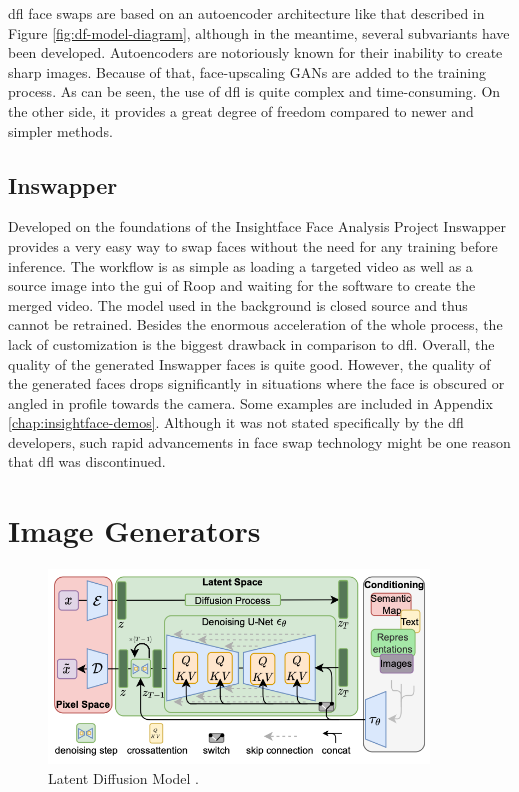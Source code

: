 \documentclass[
  a4paper,  %
  twoside,  %
  bibliography=totoc,
  headsepline,
  cleardoublepage=empty,
  parskip=half,
  draft=false
]{scrbook}
\begin{document}
\gls{dfl} face swaps are based on an autoencoder architecture like that described in Figure \ref{fig:df-model-diagram}, although in the meantime, several subvariants have been developed. Autoencoders are notoriously known for their inability to create sharp images. Because of that, face-upscaling GANs are added to the training process. As can be seen, the use of \gls{dfl} is quite complex and time-consuming. On the other side, it provides a great degree of freedom compared to newer and simpler methods.

\subsection{Inswapper}
\label{sec:roop}
Developed on the foundations of the Insightface Face Analysis Project \cite{insightfaceInsightFaceWebsite} Inswapper provides a very easy way to swap faces without the need for any training before inference. The workflow is as simple as loading a targeted video as well as a source image into the \gls{gui} of Roop \cite{sangwanRoop2023} and waiting for the software to create the merged video. The model used in the background is closed source and thus cannot be retrained. Besides the enormous acceleration of the whole process, the lack of customization is the biggest drawback in comparison to \gls{dfl}. Overall, the quality of the generated Inswapper faces is quite good. However, the quality of the generated faces drops significantly in situations where the face is obscured or angled in profile towards the camera. Some examples are included in Appendix \ref{chap:insightface-demos}. Although it was not stated specifically by the \gls{dfl} developers, such rapid advancements in face swap technology might be one reason that \gls{dfl} was discontinued.

\section{Image Generators}
\label{sec:stable-diffusion-bg}
\begin{figure}[h]
  \centering
  \includegraphics[width=0.9\textwidth]{./graphics/latent-diffusion.png}
  \caption{Latent Diffusion Model \cite{rombachHighResolutionImageSynthesis2022}.}
  \label{fig:ldm-arch}
\end{figure}
\end{document}
